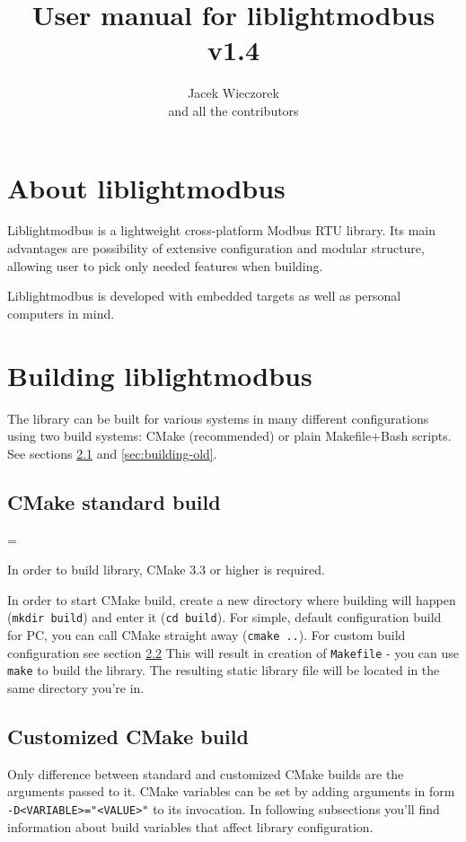 \documentclass[11pt,a4paper]{article}
\title{\textbf{User manual for liblightmodbus v1.4}}
\author{Jacek Wieczorek\\and all the contributors}
\newenvironment{warning}
{
	\par\begin{mdframed}[linewidth=0.5pt,linecolor=black]%
	\begin{list}{}{\leftmargin=1cm
	\labelwidth=\leftmargin}\item[\Large\ding{43}]
}
{	
	\end{list}\end{mdframed}\par
}
\newcommand{\warnbox}[1]{\vspace{0.2cm}\begin{warning}{#1}\end{warning}\vspace{0.2cm}}
\begin{document}

\maketitle
\thispagestyle{empty}
\newpage

\tableofcontents
\newpage

\section{About liblightmodbus}
Liblightmodbus is a lightweight cross-platform Modbus RTU library. Its main advantages are possibility of extensive configuration and modular structure, allowing user to pick only needed features when building.
\par Liblightmodbus is developed with embedded targets as well as personal computers in mind. 

\section{Building liblightmodbus} \label{sec:building}
The library can be built for various systems in many different configurations using two build systems: CMake (recommended) or plain Makefile+Bash scripts. See sections \ref{sec:building-cmake} and \ref{sec:building-old}. 

\subsection{CMake standard build} \label{sec:building-cmake}
\warnbox{In order to build library, CMake 3.3 or higher is required.}

In order to start CMake build, create a new directory where building will happen (\texttt{mkdir build}) and enter it (\texttt{cd build}).
For simple, default configuration build for PC, you can call CMake straight away (\texttt{cmake ..}). For custom build configuration see section \ref{sec:building-cmake-custom}
This will result in creation of \texttt{Makefile} - you can use \texttt{make} to build the library. The resulting static library file will be located in the same directory you're in.

\subsection{Customized CMake build} \label{sec:building-cmake-custom}
Only difference between standard and customized CMake builds are the arguments passed to it. CMake variables can be set by adding arguments in form \texttt{-D<VARIABLE>="<VALUE>"} to its invocation. In following subsections you'll find information about build variables that affect library configuration.
\end{document}
